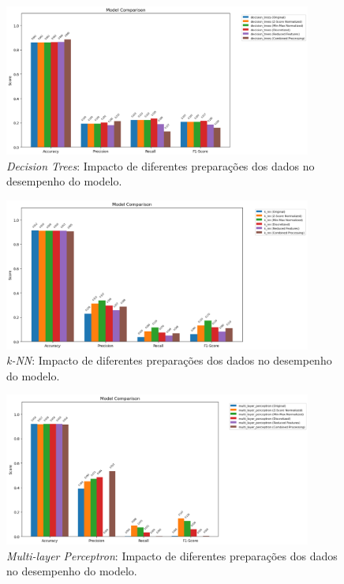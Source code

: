 \begin{figure}[H]
    \centering
    \includegraphics[width=0.9\textwidth]{images/decision_trees_comparison.png}
    \caption{\textit{Decision Trees}: Impacto de diferentes preparações dos dados no desempenho do modelo.}
    \label{fig:decision_trees_comparison}
\end{figure}

\begin{figure}[H]
    \centering
    \includegraphics[width=0.9\textwidth]{images/knn_comparison.png}
    \caption{\textit{k-NN}: Impacto de diferentes preparações dos dados no desempenho do modelo.}
    \label{fig:knn_comparison}
\end{figure}

\begin{figure}[H]
    \centering
    \includegraphics[width=0.9\textwidth]{images/mlp_comparison.png}
    \caption{\textit{Multi-layer Perceptron}: Impacto de diferentes preparações dos dados no desempenho do modelo.}
    \label{fig:mlp_comparison}
\end{figure}

